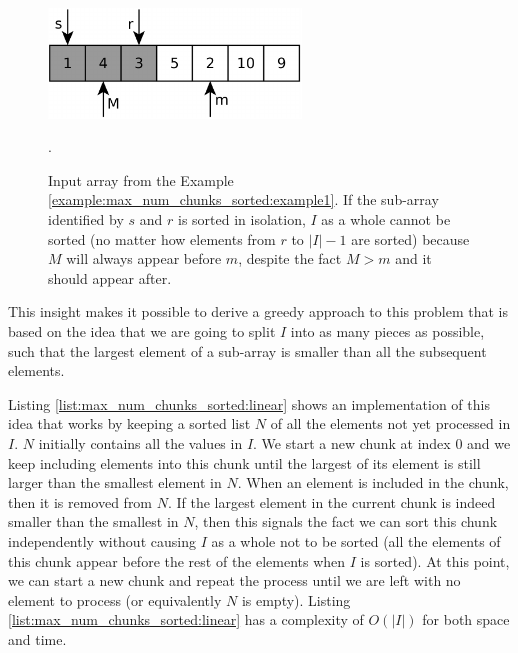 \begin{figure}
  \centering
   \includegraphics[width=0.6\textwidth]{sources/max_num_chunks_sorted/images/example1}
   \caption[]{Input array from the Example \ref{example:max_num_chunks_sorted:example1}. If the 
   sub-array identified by $s$ and $r$ is sorted in isolation, $I$ as a whole cannot be sorted (no matter how elements from $r$ to $|I|-1$ are sorted)
   because $M$ will always appear before $m$, despite the fact $M>m$ and it should appear after.}.
   \label{fig:max_num_chunks_sorted:example1}
\end{figure}

This insight makes it possible to derive a greedy approach to this problem that is based on the idea that we 
are going to split $I$ into as many pieces as possible, such that the largest element of a sub-array 
is smaller than all the subsequent elements. 

Listing \ref{list:max_num_chunks_sorted:linear} shows an implementation of this  idea that works by keeping a sorted list $N$
of all the elements not yet processed in $I$. $N$ initially contains all the values in $I$.
We start a new chunk at index $0$ and we keep including elements into this chunk until the largest
of its element is still larger than the smallest element in $N$.
When an element is included in the chunk, then it is removed from $N$.
If the largest element in the current chunk is indeed smaller than the smallest in $N$,
then this signals the fact we can sort this chunk independently without
causing $I$ as a whole not to be sorted (all the elements of this chunk appear before the rest of the elements when $I$ is sorted).
At this point, we can start a new chunk and repeat the process until
we are left with no element to process (or equivalently $N$ is empty).
Listing \ref{list:max_num_chunks_sorted:linear} has a complexity of $O(|I|)$  for both space and time. 

